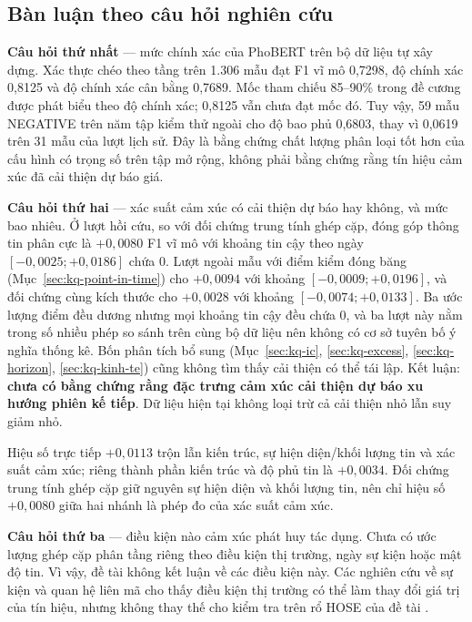 \subsection{Bàn luận theo câu hỏi nghiên cứu}

\textbf{Câu hỏi thứ nhất} --- mức chính xác của PhoBERT trên bộ dữ liệu tự xây dựng.
Xác thực chéo theo tầng trên 1.306 mẫu đạt F1 vĩ mô 0,7298, độ chính xác 0,8125 và độ
chính xác cân bằng 0,7689. Mốc tham chiếu 85--90\% trong đề cương được phát biểu theo
độ chính xác; 0,8125 vẫn chưa đạt mốc đó. Tuy vậy, 59 mẫu NEGATIVE trên năm tập kiểm
thử ngoài cho độ bao phủ 0,6803, thay vì 0,0619 trên 31 mẫu của lượt lịch sử. Đây là
bằng chứng chất lượng phân loại tốt hơn của cấu hình có trọng số trên tập mở rộng, không
phải bằng chứng rằng tín hiệu cảm xúc đã cải thiện dự báo giá.

\textbf{Câu hỏi thứ hai} --- xác suất cảm xúc có cải thiện dự báo hay không, và mức bao
nhiêu. Ở lượt hồi cứu, so với đối chứng trung tính ghép cặp, đóng góp thông tin phân cực
là $+0{,}0080$ F1 vĩ mô với khoảng tin cậy theo ngày $[-0{,}0025; +0{,}0186]$ chứa 0. Lượt
ngoài mẫu với điểm kiểm đóng băng (Mục~\ref{sec:kq-point-in-time}) cho $+0{,}0094$ với
khoảng $[-0{,}0009; +0{,}0196]$, và đối chứng cùng kích thước cho $+0{,}0028$ với khoảng
$[-0{,}0074; +0{,}0133]$. Ba ước lượng điểm đều dương nhưng mọi khoảng tin cậy đều chứa 0,
và ba lượt này nằm trong số nhiều phép so sánh trên cùng bộ dữ liệu nên không có cơ sở
tuyên bố ý nghĩa thống kê. Bốn phân tích bổ sung
(Mục~\ref{sec:kq-ic}, \ref{sec:kq-excess}, \ref{sec:kq-horizon}, \ref{sec:kq-kinh-te})
cũng không tìm thấy cải thiện có thể tái lập. Kết luận:
\textbf{chưa có bằng chứng rằng đặc trưng cảm xúc cải thiện dự báo xu hướng phiên kế
tiếp}. Dữ liệu hiện tại không loại trừ cả cải thiện nhỏ lẫn suy giảm nhỏ.

Hiệu số trực tiếp $+0{,}0113$ trộn lẫn kiến trúc, sự hiện diện/khối lượng tin và xác suất
cảm xúc; riêng thành phần kiến trúc và độ phủ tin là $+0{,}0034$. Đối chứng trung tính
ghép cặp giữ nguyên sự hiện diện và khối lượng tin, nên chỉ hiệu số $+0{,}0080$ giữa hai
nhánh là phép đo của xác suất cảm xúc.

\textbf{Câu hỏi thứ ba} --- điều kiện nào cảm xúc phát huy tác dụng. Chưa có ước lượng ghép
cặp phân tầng riêng theo điều kiện thị trường, ngày sự kiện hoặc mật độ tin. Vì vậy, đề tài
không kết luận về các điều kiện này. Các nghiên cứu về sự kiện và quan hệ liên mã cho thấy
điều kiện thị trường có thể làm thay đổi giá trị của tín hiệu, nhưng không thay thế cho kiểm
tra trên rổ HOSE của đề tài \cite{Chen2019_191005078v1,Xu2021_210207372v2,Siala2026_260200086v3}.

